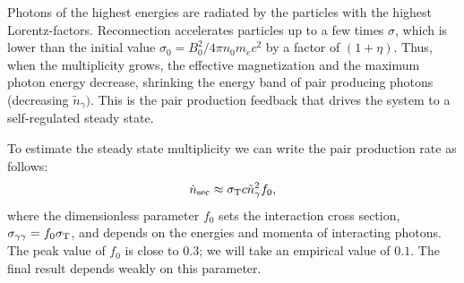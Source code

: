 
Photons of the highest energies are radiated by the particles with the highest Lorentz-factors. Reconnection accelerates particles up to a few times $\sigma$, which is lower than the initial value $\sigma_0=B_0^2/4\pi n_0 m_e c^2$ by a factor of $(1+\eta)$. Thus, when the multiplicity grows, the effective magnetization and the maximum photon energy decrease, shrinking the energy band of pair producing photons (decreasing $\tilde{n}_{\gamma})$. This is the pair production feedback that drives the system to a self-regulated steady state.

To estimate the steady state multiplicity we can write the pair production rate as follows:
\begin{equation}\label{eq:pairprod-pair_rate}
    \dot{n}_{\rm sec} \approx \sigma_{\rm T} c \tilde{n}_\gamma^2 f_0,
\end{equation}
where the dimensionless parameter $f_0$ sets the interaction cross section, $\sigma_{\gamma\gamma} = f_0 \sigma_{\rm T}$, and depends on the energies and momenta of interacting photons. The peak value of $f_0$ is close to $0.3$; we will take an empirical value of $0.1$. The final result depends weakly on this parameter.

